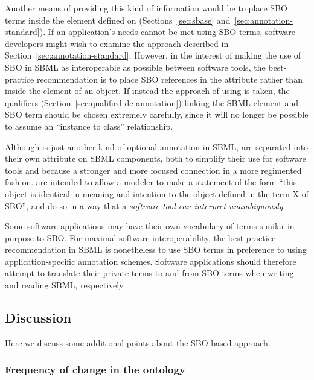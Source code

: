 \begin{blockChanged}

Another means of providing this kind of information would be to
place SBO terms inside the  element
defined on \SBase (Sections~\ref{sec:sbase} and~\ref{sec:annotation-standard}).
If an application's needs cannot be met using SBO terms, software developers might wish to
examine the approach described in Section~\ref{sec:annotation-standard}. 
However, in the interest of making the use of SBO in SBML
as interoperable as possible between software tools, the best-practice
recommendation is to place SBO references in the 
attribute rather than inside the 
element of an object. If instead the approach of using  is taken, the qualifiers (Section~\ref{sec:qualified-dc-annotation}) linking the SBML element and SBO term should be chosen extremely carefully, since it will no longer be possible to assume an ``instance to class'' relationship. 

\end{blockChanged}

Although  is just another kind of optional
annotation in SBML,  are separated into
their own attribute on SBML components, both to simplify their use
for software tools and because  a stronger and
more focused connection in a more regimented fashion.   are intended to allow a modeler to make a statement of
the form ``this object is identical in meaning and intention to
the object defined in the term X of SBO'', and do so in a way
that a \emph{software tool can interpret unambiguously}.

Some software applications may have their own vocabulary of terms
similar in purpose to SBO.  For maximal software interoperability,
the best-practice recommendation in SBML is nonetheless to use SBO
terms in preference to using application-specific annotation
schemes.  Software applications should therefore attempt to
translate their private terms to and from SBO terms when writing
and reading SBML, respectively.


\subsection{Discussion}

Here we discuss some additional points about the SBO-based
approach.

\subsubsection{Frequency of change in the ontology}
\label{sec:sbo-frequency-of-change}

